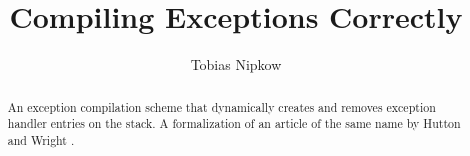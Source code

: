 \documentclass[11pt,a4paper]{article}
\begin{document}
\title{Compiling Exceptions Correctly}
\author{Tobias Nipkow}
\maketitle

\begin{abstract}
  An exception compilation scheme that dynamically creates and removes
  exception handler entries on the stack.  A formalization of an
  article of the same name by Hutton and Wright \cite{HuttonW04}.
\end{abstract}





\end{document}
